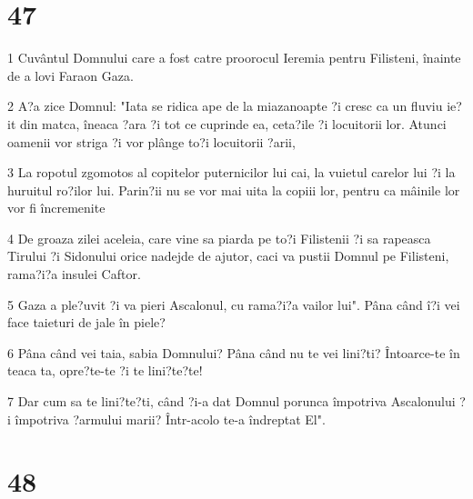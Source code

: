 \chapter{47}

\par 1 Cuvântul Domnului care a fost catre proorocul Ieremia pentru Filisteni, înainte de a lovi Faraon Gaza.
\par 2 A?a zice Domnul: "Iata se ridica ape de la miazanoapte ?i cresc ca un fluviu ie?it din matca, îneaca ?ara ?i tot ce cuprinde ea, ceta?ile ?i locuitorii lor. Atunci oamenii vor striga ?i vor plânge to?i locuitorii ?arii,
\par 3 La ropotul zgomotos al copitelor puternicilor lui cai, la vuietul carelor lui ?i la huruitul ro?ilor lui. Parin?ii nu se vor mai uita la copiii lor, pentru ca mâinile lor vor fi încremenite
\par 4 De groaza zilei aceleia, care vine sa piarda pe to?i Filistenii ?i sa rapeasca Tirului ?i Sidonului orice nadejde de ajutor, caci va pustii Domnul pe Filisteni, rama?i?a insulei Caftor.
\par 5 Gaza a ple?uvit ?i va pieri Ascalonul, cu rama?i?a vailor lui". Pâna când î?i vei face taieturi de jale în piele?
\par 6 Pâna când vei taia, sabia Domnului? Pâna când nu te vei lini?ti? Întoarce-te în teaca ta, opre?te-te ?i te lini?te?te!
\par 7 Dar cum sa te lini?te?ti, când ?i-a dat Domnul porunca împotriva Ascalonului ?i împotriva ?armului marii? Într-acolo te-a îndreptat El".

\chapter{48}

